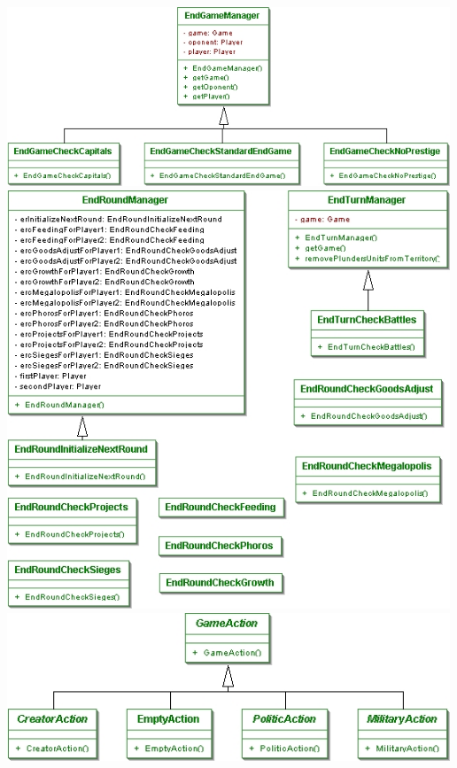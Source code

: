 \documentclass[11 pt]{book}
\begin{document}
\begin{center}
		    \includegraphics[width=500px]{design-uml/iteration7/endgamemanager.jpg}
		    \includegraphics[width=500px]{design-uml/iteration7/enroundsandturns.jpg}
		    \includegraphics[width=500px]{design-uml/iteration7/game1.jpg}

\end{center}
\end{document}
